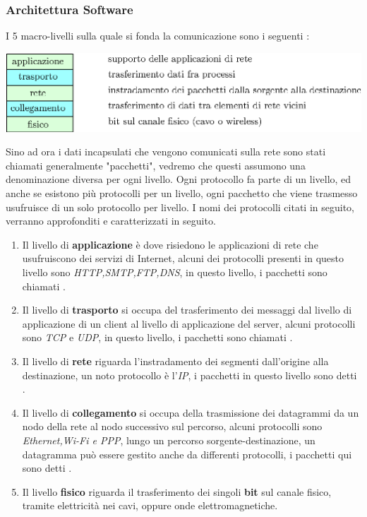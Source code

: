 \documentclass[10pt, letterpaper]{report}
\begin{document}
\subsubsection{Architettura Software}
I 5 macro-livelli sulla quale si fonda la comunicazione sono i seguenti :
\begin{center}
    \includegraphics[width=1\textwidth ]{images/livelli.eps}
\end{center}
Sino ad ora i dati incapsulati che vengono comunicati sulla rete sono stati chiamati generalmente
"pacchetti", vedremo che questi assumono una denominazione diversa per ogni livello. Ogni protocollo
fa parte di un livello, ed anche se esistono più protocolli per un livello, ogni pacchetto
che viene trasmesso usufruisce di un solo protocollo per livello. I nomi dei protocolli citati in
seguito, verranno approfonditi e caratterizzati in seguito.
\begin{enumerate}
    \item Il livello di \textbf{applicazione} è dove risiedono le applicazioni di rete che
          usufruiscono dei servizi di Internet, alcuni dei protocolli presenti in questo livello
          sono \textit{HTTP,SMTP,FTP,DNS}, in questo livello, i pacchetti sono chiamati
          .
    \item Il livello di \textbf{trasporto} si occupa del trasferimento dei messaggi  dal livello di
          applicazione di un client al livello di applicazione del server, alcuni protocolli sono
          \textit{TCP} e \textit{UDP}, in questo livello, i pacchetti sono chiamati
          .
    \item Il livello di \textbf{rete} riguarda l'instradamento dei segmenti dall'origine alla
          destinazione, un noto protocollo è l'\textit{IP}, i pacchetti in questo livello sono detti
          .
    \item Il livello di \textbf{collegamento} si occupa della trasmissione dei datagrammi da un
          nodo della rete al nodo successivo sul percorso, alcuni protocolli sono \textit{Ethernet,Wi-Fi e
              PPP}, lungo un percorso sorgente-destinazione, un datagramma può essere gestito anche da
          differenti protocolli, i pacchetti qui sono detti .
    \item Il livello \textbf{fisico} riguarda il trasferimento dei singoli \textbf{bit} sul canale
          fisico, tramite elettricità nei cavi, oppure onde elettromagnetiche.
\end{enumerate}
\end{document}
